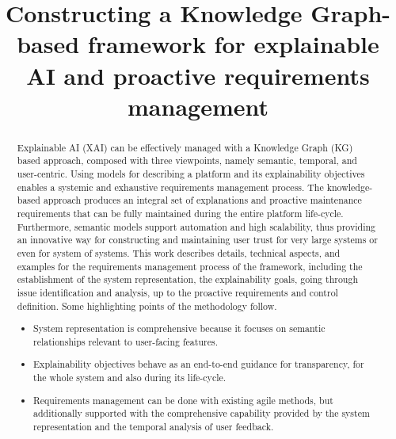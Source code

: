 \documentclass[preprint,10pt]{elsarticle}
\begin{document}
\begin{frontmatter}

    \title{Constructing a Knowledge Graph-based framework for explainable AI and proactive requirements management}

    
    

    \begin{abstract}
    Explainable AI (XAI) can be effectively managed with a Knowledge Graph (KG) based approach, composed with three viewpoints, namely semantic, temporal, and user-centric. Using models for describing a platform and its explainability objectives enables a systemic and exhaustive requirements management process. The knowledge-based approach produces an integral set of explanations and proactive maintenance requirements that can be fully maintained during the entire platform life-cycle. Furthermore, semantic models support automation and high scalability, thus providing an innovative way for constructing and maintaining user trust for very large systems or even for system of systems. This work describes details, technical aspects, and examples for the requirements management process of the framework, including the establishment of the system representation, the explainability goals, going through issue identification and analysis, up to the proactive requirements and control definition. Some highlighting points of the methodology follow.
    \begin{itemize}
        \item System representation is comprehensive because it focuses on semantic relationships relevant to user-facing features.
        \item Explainability objectives behave as an end-to-end guidance for transparency, for the whole system and also during its life-cycle.
        \item Requirements management can be done with existing agile methods, but additionally supported with the comprehensive capability provided by the system representation and the temporal analysis of user feedback.
    \end{itemize}
    \end{abstract}


\end{frontmatter}
\end{document}
